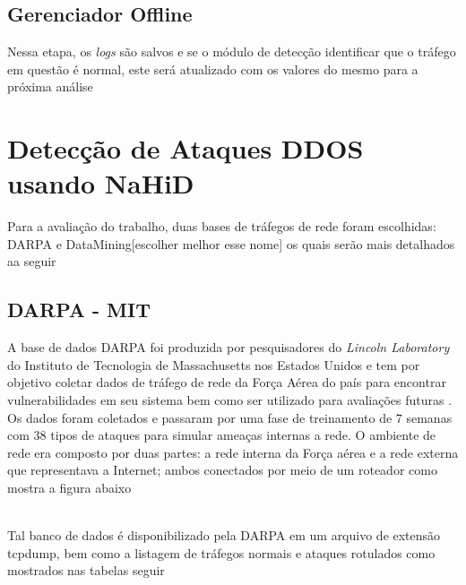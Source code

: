 \subsection{Gerenciador Offline}
Nessa etapa, os \textit{logs} são salvos e se o módulo de detecção identificar que o tráfego em questão é normal, este será atualizado com os valores do mesmo para a próxima análise

\section{Detecção de Ataques DDOS usando NaHiD}
\label{Sec:NaHiD_VERC}
Para a avaliação do trabalho, duas bases de tráfegos de rede foram escolhidas: DARPA e  DataMining[escolher melhor esse nome] os quais serão mais detalhados aa seguir 
\subsection{DARPA - MIT}
 A base de dados DARPA foi produzida por pesquisadores do \textit{Lincoln Laboratory} do Instituto de Tecnologia de Massachusetts nos Estados Unidos e tem por objetivo coletar dados de tráfego de rede da Força Aérea do país para encontrar vulnerabilidades em seu sistema bem como ser utilizado para avaliações futuras . Os dados foram coletados e passaram por uma fase de treinamento de 7 semanas com 38 tipos de ataques para simular ameaças internas a rede. O ambiente de rede era composto por duas partes: a rede interna da Força aérea e a rede externa que representava a Internet; ambos conectados por meio de um roteador como mostra a figura abaixo
\\
Tal banco de dados é disponibilizado pela DARPA em um arquivo de extensão tcpdump, bem como a listagem de tráfegos normais e ataques rotulados como mostrados nas tabelas seguir

